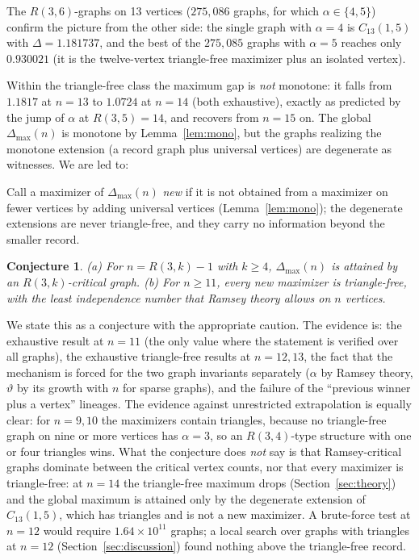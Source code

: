\documentclass[11pt]{article}
\newtheorem{conjecture}{Conjecture}
\renewcommand{\theta}{\vartheta}
\newcommand{\gap}{\Delta}
\begin{document}
The $R(3,6)$-graphs on 13 vertices ($275{,}086$ graphs, for which $\alpha\in\{4,5\}$) confirm the picture from the other side: the single graph with $\alpha=4$ is $C_{13}(1,5)$ with $\gap=1.181737$, and the best of the $275{,}085$ graphs with $\alpha=5$ reaches only $0.930021$ (it is the twelve-vertex triangle-free maximizer plus an isolated vertex).

Within the triangle-free class the maximum gap is \emph{not} monotone: it falls from $1.1817$ at $n=13$ to $1.0724$ at $n=14$ (both exhaustive), exactly as predicted by the jump of $\alpha$ at $R(3,5)=14$, and recovers from $n=15$ on. The global $\gap_{\max}(n)$ is monotone by Lemma~\ref{lem:mono}, but the graphs realizing the monotone extension (a record graph plus universal vertices) are degenerate as witnesses. We are led to:

Call a maximizer of $\gap_{\max}(n)$ \emph{new} if it is not obtained from a maximizer on fewer vertices by adding universal vertices (Lemma~\ref{lem:mono}); the degenerate extensions are never triangle-free, and they carry no information beyond the smaller record.

\begin{conjecture}\label{conj}
(a) For $n=R(3,k)-1$ with $k\ge4$, $\gap_{\max}(n)$ is attained by an $R(3,k)$-critical graph. (b) For $n\ge 11$, every new maximizer is triangle-free, with the least independence number that Ramsey theory allows on $n$ vertices.
\end{conjecture}

We state this as a conjecture with the appropriate caution. The evidence is: the exhaustive result at $n=11$ (the only value where the statement is verified over all graphs), the exhaustive triangle-free results at $n=12,13$, the fact that the mechanism is forced for the two graph invariants separately ($\alpha$ by Ramsey theory, $\theta$ by its growth with $n$ for sparse graphs), and the failure of the ``previous winner plus a vertex'' lineages. The evidence against unrestricted extrapolation is equally clear: for $n=9,10$ the maximizers contain triangles, because no triangle-free graph on nine or more vertices has $\alpha=3$, so an $R(3,4)$-type structure with one or four triangles wins. What the conjecture does \emph{not} say is that Ramsey-critical graphs dominate between the critical vertex counts, nor that every maximizer is triangle-free: at $n=14$ the triangle-free maximum drops (Section~\ref{sec:theory}) and the global maximum is attained only by the degenerate extension of $C_{13}(1,5)$, which has triangles and is not a new maximizer. A brute-force test at $n=12$ would require $1.64\times10^{11}$ graphs; a local search over graphs with triangles at $n=12$ (Section~\ref{sec:discussion}) found nothing above the triangle-free record.
\end{document}
